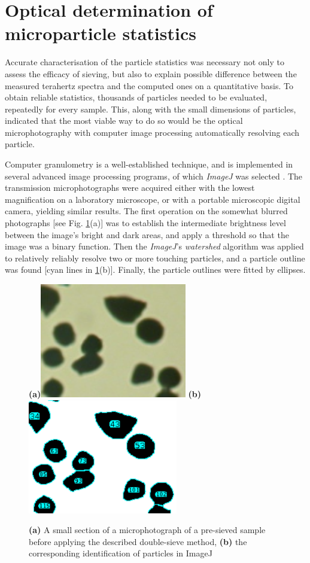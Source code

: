 \section{Optical determination of microparticle statistics}
Accurate characterisation of the particle statistics was necessary not only to assess the efficacy of sieving, but also to explain possible difference between the measured terahertz spectra and the computed ones on a quantitative basis. To obtain reliable statistics, thousands of particles needed to be evaluated, repeatedly for every sample. This, along with the small dimensions of particles, indicated that the most viable way to do so would be the optical microphotography with computer image processing automatically resolving each particle.

Computer granulometry
is a well-established technique, and is implemented in several advanced image processing programs, of which \textit{ImageJ} was selected \cite{abramoff2004image}. 
The transmission microphotographs were acquired either with the lowest magnification on a laboratory microscope, or with a portable microscopic digital camera, yielding similar results.
The first operation on the somewhat blurred photographs [see Fig. \ref{fg_sievingstats}(a)] was to establish the intermediate brightness level between the image's bright and dark areas, and apply a threshold so that the image was a binary function. Then the \textit{ImageJ}'s \textit{watershed} algorithm was applied to relatively reliably resolve two or more touching particles, and a particle outline was found [cyan lines in \ref{fg_sievingstats}(b)]. Finally, the particle outlines were fitted by ellipses. 
\begin{figure}[ht] \caption{\textbf{(a)} A small section of a microphotograph of a pre-sieved sample before applying the described double-sieve method, \textbf{(b)} the corresponding identification of particles in ImageJ} \label{fg_sievingstats} \centering 
\textbf{(a)}\includegraphics[height=5cm]{img/technology/imagej_photo.pdf}
\textbf{(b)}\includegraphics[height=5cm]{img/technology/imagej_found.pdf}
\end{figure}
